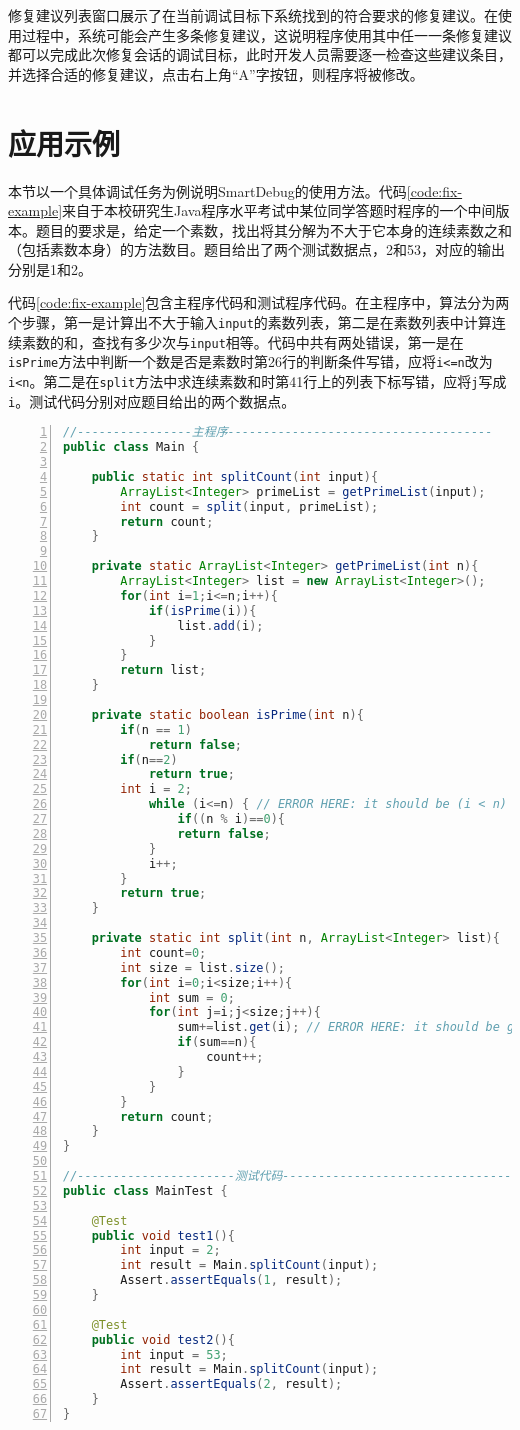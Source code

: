 修复建议列表窗口展示了在当前调试目标下系统找到的符合要求的修复建议。在使用过程中，系统可能会产生多条修复建议，这说明程序使用其中任一一条修复建议都可以完成此次修复会话的调试目标，此时开发人员需要逐一检查这些建议条目，并选择合适的修复建议，点击右上角“A”字按钮，则程序将被修改。

\section{应用示例}
本节以一个具体调试任务为例说明SmartDebug的使用方法。代码\ref{code:fix-example}来自于本校研究生Java程序水平考试中某位同学答题时程序的一个中间版本。题目的要求是，给定一个素数，找出将其分解为不大于它本身的连续素数之和（包括素数本身）的方法数目。题目给出了两个测试数据点，2和53，对应的输出分别是1和2。

代码\ref{code:fix-example}包含主程序代码和测试程序代码。在主程序中，算法分为两个步骤，第一是计算出不大于输入\texttt{input}的素数列表，第二是在素数列表中计算连续素数的和，查找有多少次与\texttt{input}相等。代码中共有两处错误，第一是在\texttt{isPrime}方法中判断一个数是否是素数时第26行的判断条件写错，应将\texttt{i<=n}改为\texttt{i<n}。第二是在\texttt{split}方法中求连续素数和时第41行上的列表下标写错，应将\texttt{j}写成\texttt{i}。测试代码分别对应题目给出的两个数据点。

\begin{lstlisting}[caption=应用示例,frame=single,language=Java,numbers=left,basicstyle=\ttfamily\footnotesize,label={code:fix-example},tabsize=2]
//----------------主程序-------------------------------------
public class Main {
	
	public static int splitCount(int input){
		ArrayList<Integer> primeList = getPrimeList(input);
		int count = split(input, primeList);
		return count;
	}
	
	private static ArrayList<Integer> getPrimeList(int n){		
		ArrayList<Integer> list = new ArrayList<Integer>();
		for(int i=1;i<=n;i++){
			if(isPrime(i)){
				list.add(i);
			}
		}
		return list;
	}
	
	private static boolean isPrime(int n){
		if(n == 1)
			return false;
		if(n==2)
			return true;
		int i = 2;
			while (i<=n) { // ERROR HERE: it should be (i < n)
				if((n % i)==0){
				return false;
			}
			i++;
		}
		return true;
	}

	private static int split(int n, ArrayList<Integer> list){
		int count=0;
		int size = list.size();
		for(int i=0;i<size;i++){
			int sum = 0;			
			for(int j=i;j<size;j++){
				sum+=list.get(i); // ERROR HERE: it should be get(j)
				if(sum==n){
					count++;
				}
			}
		}
		return count;
	}
}

//----------------------测试代码---------------------------------
public class MainTest {

	@Test
	public void test1(){
		int input = 2;
		int result = Main.splitCount(input);
		Assert.assertEquals(1, result);
	}

	@Test
	public void test2(){
		int input = 53;
		int result = Main.splitCount(input);
		Assert.assertEquals(2, result);
	}
}
\end{lstlisting}

